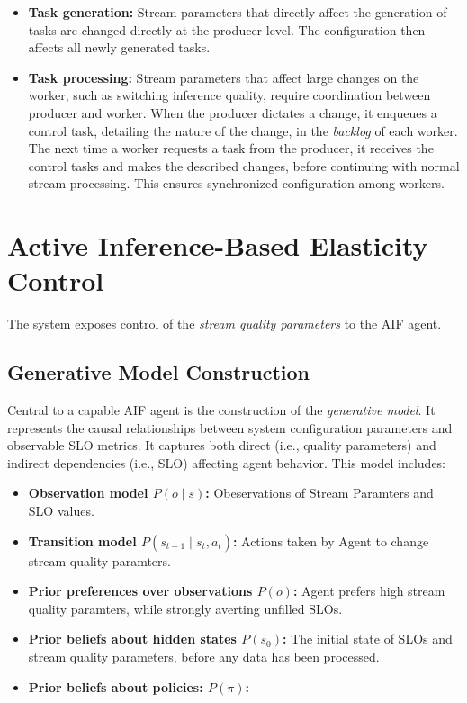 \begin{itemize}
    \item \textbf{Task generation:} Stream parameters that directly affect the generation of tasks are changed directly at the producer level. The configuration then affects all newly generated tasks.
    \item \textbf{Task processing:} Stream parameters that affect large changes on the worker, such as switching inference quality, require coordination between producer and worker. When the producer dictates a change, it enqueues a control task, detailing the nature of the change, in the \textit{backlog}\label{def:backlog} of each worker. The next time a worker requests a task from the producer, it receives the control tasks and makes the described changes, before continuing with normal stream processing. This ensures synchronized configuration among workers.
\end{itemize}



\section{Active Inference-Based Elasticity Control}
The system exposes control of the \textit{stream quality parameters} to the AIF agent.
\subsection{Generative Model Construction}
Central to a capable AIF agent is the construction of the \textit{generative model}. It represents the causal relationships between system configuration parameters and observable SLO metrics. It captures both direct (i.e., quality parameters) and indirect dependencies (i.e., SLO) affecting agent behavior. This model includes:
\begin{itemize}
  \item \textbf{Observation model \(P(o \mid s)\):} Obeservations of Stream Paramters and SLO values.
  \item \textbf{Transition model \(P(s_{t+1} \mid s_t,a_t)\):} Actions taken by Agent to change stream quality paramters.
  \item \textbf{Prior preferences over observations \(P(o)\):} Agent prefers high stream quality paramters, while strongly averting unfilled SLOs.
  \item \textbf{Prior beliefs about hidden states \(P(s_0)\):} The initial state of SLOs and stream quality parameters, before any data has been processed.
  \item \textbf{Prior beliefs about policies: \(P(\pi)\):} 
\end{itemize}

